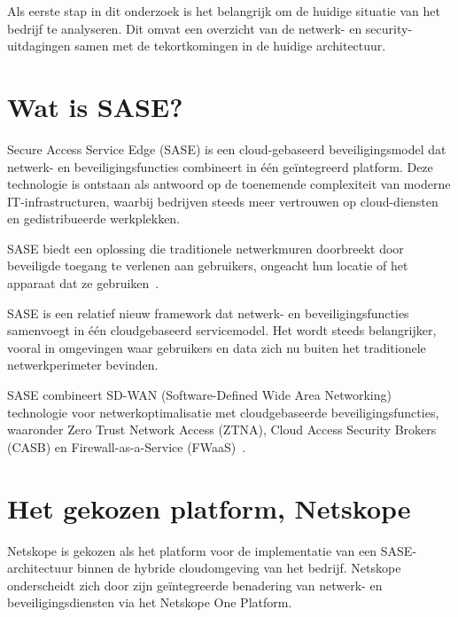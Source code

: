 \vspace{2ex}

Als eerste stap in dit onderzoek is het belangrijk om de huidige situatie van het bedrijf te analyseren. Dit omvat een overzicht van de netwerk- en security-uitdagingen samen met de tekortkomingen in de huidige architectuur.

\section{Wat is SASE?}
Secure Access Service Edge (SASE) is een cloud-gebaseerd beveiligingsmodel dat netwerk- en beveiligingsfuncties combineert in één geïntegreerd platform. Deze technologie is ontstaan als antwoord op de toenemende complexiteit van moderne IT-infrastructuren, waarbij bedrijven steeds meer vertrouwen op cloud-diensten en gedistribueerde werkplekken.

\vspace{2ex}

SASE biedt een oplossing die traditionele netwerkmuren doorbreekt door beveiligde toegang te verlenen aan gebruikers, ongeacht hun locatie of het apparaat dat ze gebruiken~\autocite{KPN2023}.

\vspace{2ex}

SASE is een relatief nieuw framework dat netwerk- en beveiligingsfuncties samenvoegt in één cloudgebaseerd servicemodel. Het wordt steeds belangrijker, vooral in omgevingen waar gebruikers en data zich nu buiten het traditionele netwerkperimeter bevinden. 

\vspace{2ex}

SASE combineert SD-WAN (Software-Defined Wide Area Networking) technologie voor netwerkoptimalisatie met cloudgebaseerde beveiligingsfuncties, waaronder Zero Trust Network Access (ZTNA), Cloud Access Security Brokers (CASB) en Firewall-as-a-Service (FWaaS)~\autocite{ZPE2025}.

\section{Het gekozen platform, Netskope}
Netskope is gekozen als het platform voor de implementatie van een SASE-architectuur binnen de hybride cloudomgeving van het bedrijf. Netskope onderscheidt zich door zijn geïntegreerde benadering van netwerk- en beveiligingsdiensten via het Netskope One Platform. 

\vspace{2ex}


